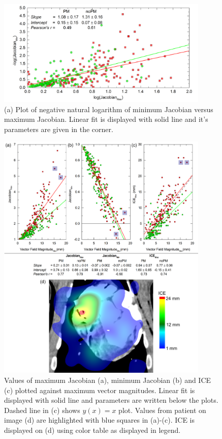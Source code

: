 \documentclass[type=dr, dr=rernat, accentcolor=tud7b,colorbacktitle, bigchapter, openright, twoside, 12pt ]{tudthesis}
\begin{document}
\begin{figure}[H]
	\begin{center}		
		\includegraphics[width=0.9\textwidth]{./Images/JacSum2.png}
		\caption{(a) Plot of negative natural logarithm of minimum Jacobian versus maximum Jacobian. Linear fit is displayed with solid line and it's parameters are given in the corner.}
		\label{calcJac_pigs}
	\end{center}
\end{figure}

\begin{figure}[H]
	\begin{center}		
		\includegraphics[width=0.9\textwidth]{./Images/MaxVfdata_pigs.png}
		\caption{Values of maximum Jacobian (a), minimum Jacobian (b) and ICE (c) plotted against maximum vector magnitudes. Linear fit is displayed with solid line and parameters are written below the plots. Dashed line in (c) shows $y(x)= x$ plot. Values from patient on image (d) are highlighted with blue squares in (a)-(c).
			ICE is displayed on (d) using color table as displayed in legend.}
		\label{maxvf_pigs}
	\end{center}
\end{figure}
\end{document}
